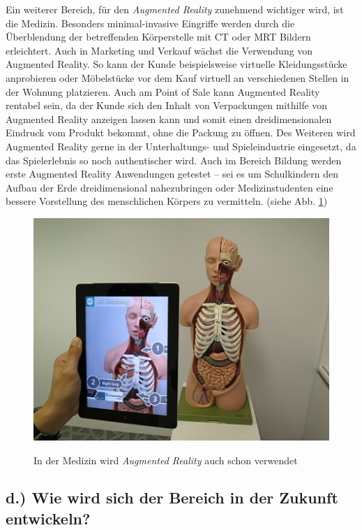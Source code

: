 \documentclass[12pt,utf8]{scrartcl}
\begin{document}
\begin{flushleft}
Ein weiterer Bereich, für den \textit{Augmented Reality} zunehmend wichtiger wird, ist die Medizin.  Besonders minimal-invasive Eingriffe werden durch die Überblendung der betreffenden Körperstelle mit CT oder MRT Bildern erleichtert. Auch in Marketing und Verkauf wächst die Verwendung von Augmented Reality. So kann der Kunde beispielsweise virtuelle Kleidungsstücke anprobieren oder Möbelstücke vor dem Kauf virtuell an verschiedenen Stellen in der Wohnung platzieren. Auch am Point of Sale kann Augmented Reality rentabel sein, da der Kunde sich den Inhalt von Verpackungen mithilfe von Augmented Reality anzeigen lassen kann und somit einen dreidimensionalen Eindruck vom Produkt bekommt, ohne die Packung zu öffnen. Des Weiteren wird Augmented Reality gerne in der Unterhaltungs- und Spieleindustrie eingesetzt, da das Spielerlebnis so noch authentischer wird. Auch im Bereich Bildung werden erste Augmented Reality Anwendungen getestet – sei es um Schulkindern den Aufbau der Erde dreidimensional nahezubringen oder Medizinstudenten eine bessere Vorstellung des menschlichen Körpers zu vermitteln. (siehe Abb. \ref{fig:med})
\linebreak

\begin{figure}[H]
	\centering
	\includegraphics[width=0.8\linewidth]{images/medizin}
	\caption{In der Medizin wird \textit{Augmented Reality} auch schon verwendet} \cite{online3}
	\label{fig:med}
\end{figure}

\subsection{\label{sub4:thema}d.) Wie wird sich der Bereich in der Zukunft entwickeln?}


\end{flushleft}
\end{document}
